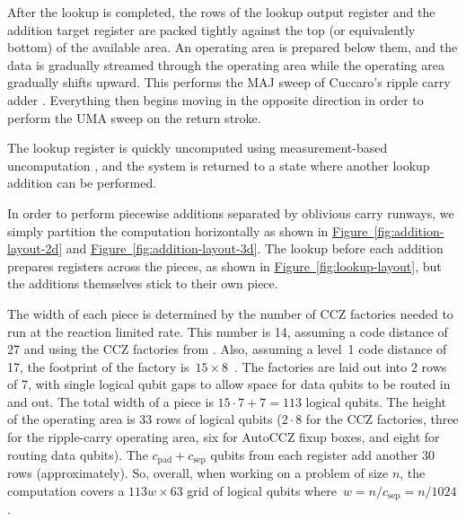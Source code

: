 \documentclass[a4paper, onecolumn, accepted=2021-03-29]{quantumarticle}
\newcommand{\fig}[1]{\hyperref[fig:#1]{Figure~\ref*{fig:#1}}}
\newcommand{\gsep}{{c_{\text{sep}}}}
\newcommand{\gpad}{{c_{\text{pad}}}}
\begin{document}
After the lookup is completed, the rows of the lookup output register and the addition target register are packed tightly against the top (or equivalently bottom) of the available area.
An operating area is prepared below them, and the data is gradually streamed through the operating area while the operating area gradually shifts upward.
This performs the MAJ sweep of Cuccaro's ripple carry adder \cite{cuccaro2004adder}.
Everything then begins moving in the opposite direction in order to perform the UMA sweep on the return stroke.

The lookup register is quickly uncomputed using measurement-based uncomputation \cite{berry2019qubitization}, and the system is returned to a state where another lookup addition can be performed.

In order to perform piecewise additions separated by oblivious carry runways, we simply partition the computation horizontally as shown in \fig{addition-layout-2d} and \fig{addition-layout-3d}.
The lookup before each addition prepares registers across the pieces, as shown in \fig{lookup-layout}, but the additions themselves stick to their own piece.

The width of each piece is determined by the number of CCZ factories needed to run at the reaction limited rate.
This number is 14, assuming a code distance of 27 and using the CCZ factories from \cite{gidney2019autoccz, gidney2018magic}.
Also, assuming a level~1 code distance of 17, the footprint of the factory is~$15 \times 8$~\cite{gidney2019autoccz}.
The factories are laid out into 2 rows of 7, with single logical qubit gaps to allow space for data qubits to be routed in and out.
The total width of a piece is $15 \cdot 7 + 7 = 113$ logical qubits.
The height of the operating area is 33 rows of logical qubits ($2 \cdot 8$ for the CCZ factories, three for the ripple-carry operating area, six for AutoCCZ fixup boxes, and eight for routing data qubits).
The $\gpad + \gsep$ qubits from each register add another 30 rows (approximately).
So, overall, when working on a problem of size $n$, the computation covers a $113w \times 63$ grid of logical qubits where~$w=n/\gsep=n/1024$.
\end{document}
